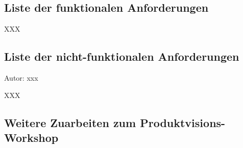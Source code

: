 \documentclass[twoside]{report}
\begin{document}


\subsection{Liste der funktionalen Anforderungen}

XXX

%
%
% 

\subsection{Liste der nicht-funktionalen Anforderungen}
{\small Autor: xxx}

XXX

\subsection{Weitere Zuarbeiten zum Produktvisions-Workshop}
\end{document}
